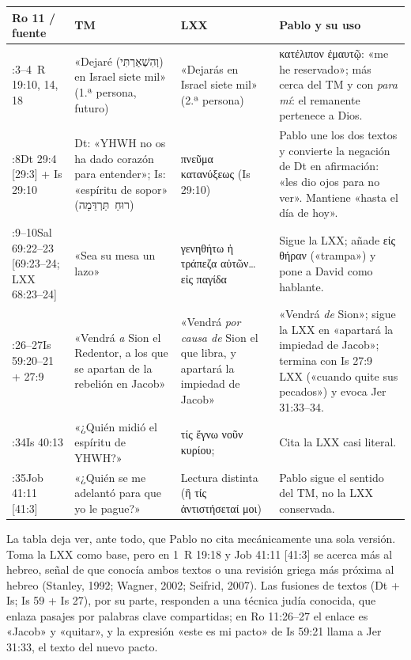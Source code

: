 \documentclass[11pt,letterpaper]{article}
\newcommand{\heb}[1]{\mbox{\foreignlanguage{hebrew}{#1}}}
\newcommand{\grc}[1]{\foreignlanguage{ancientgreek}{#1}}
\begin{document}
\begin{center}\footnotesize
\renewcommand{\arraystretch}{1.3}
\begin{tabular}{>{\RaggedRight\arraybackslash}p{2.1cm}>{\RaggedRight\arraybackslash}p{3.6cm}>{\RaggedRight\arraybackslash}p{3.6cm}>{\RaggedRight\arraybackslash}p{4.6cm}}
\toprule
\textbf{Ro 11 / fuente} & \textbf{TM} & \textbf{LXX} & \textbf{Pablo y su uso}\\
\midrule
11:3--4\newline 1~R 19:10, 14, 18 & «Dejaré (\heb{וְהִשְׁאַרְתִּי}) en Israel siete mil» (1.ª persona, futuro) & «Dejarás en Israel siete mil» (2.ª persona) & \grc{κατέλιπον ἐμαυτῷ}: «me he reservado»; más cerca del TM y con \emph{para mí}: el remanente pertenece a Dios.\\
11:8\newline Dt 29:4 [29:3] + Is 29:10 & Dt: «YHWH no os ha dado corazón para entender»; Is: «espíritu de sopor» (\heb{רוּחַ תַּרְדֵּמָה}) & \grc{πνεῦμα κατανύξεως} (Is 29:10) & Pablo une los dos textos y convierte la negación de Dt en afirmación: «les dio ojos para no ver». Mantiene «hasta el día de hoy».\\
11:9--10\newline Sal 69:22--23 [69:23--24; LXX 68:23--24] & «Sea su mesa un lazo» & \grc{γενηθήτω ἡ τράπεζα αὐτῶν… εἰς παγίδα} & Sigue la LXX; añade \grc{εἰς θήραν} («trampa») y pone a David como hablante.\\
11:26--27\newline Is 59:20--21 + 27:9 & «Vendrá \emph{a} Sion el Redentor, a los que se apartan de la rebelión en Jacob» & «Vendrá \emph{por causa de} Sion el que libra, y apartará la impiedad de Jacob» & «Vendrá \emph{de} Sion»; sigue la LXX en «apartará la impiedad de Jacob»; termina con Is 27:9 LXX («cuando quite sus pecados») y evoca Jer 31:33--34.\\
11:34\newline Is 40:13 & «¿Quién midió el espíritu de YHWH?» & \grc{τίς ἔγνω νοῦν κυρίου;} & Cita la LXX casi literal.\\
11:35\newline Job 41:11 [41:3] & «¿Quién se me adelantó para que yo le pague?» & Lectura distinta (\grc{ἢ τίς ἀντιστήσεταί μοι}) & Pablo sigue el sentido del TM, no la LXX conservada.\\
\bottomrule
\end{tabular}\end{center}

La tabla deja ver, ante todo, que Pablo no cita mecánicamente una sola versión. Toma la LXX como base, pero en 1~R 19:18 y Job 41:11 [41:3] se acerca más al hebreo, señal de que conocía ambos textos o una revisión griega más próxima al hebreo (Stanley, 1992; Wagner, 2002; Seifrid, 2007). Las fusiones de textos (Dt + Is; Is 59 + Is 27), por su parte, responden a una técnica judía conocida, que enlaza pasajes por palabras clave compartidas; en Ro 11:26--27 el enlace es «Jacob» y «quitar», y la expresión «este es mi pacto» de Is 59:21 llama a Jer 31:33, el texto del nuevo pacto.
\end{document}
